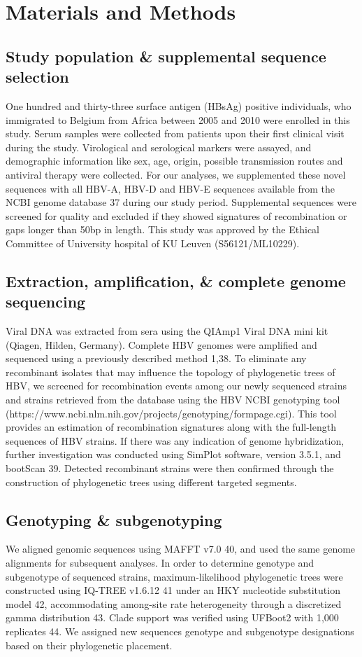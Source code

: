 \section{Materials and Methods}
\subsection{Study population \& supplemental sequence selection}
One hundred and thirty-three surface antigen (HBsAg) positive individuals, who immigrated to Belgium from Africa between 2005 and 2010 were enrolled in this study. Serum samples were collected from patients upon their first clinical visit during the study. Virological and serological markers were assayed, and demographic information like sex, age, origin, possible transmission routes and antiviral therapy were collected. For our analyses, we supplemented these novel sequences with all HBV-A, HBV-D and HBV-E sequences available from the NCBI genome database 37 during our study period. Supplemental sequences were screened for quality and excluded if they showed signatures of recombination or gaps longer than 50bp in length. This study was approved by the Ethical Committee of University hospital of KU Leuven (S56121/ML10229).\\

\subsection{Extraction, amplification, \& complete genome sequencing}

Viral DNA was extracted from sera using the QIAmp1 Viral DNA mini kit (Qiagen, Hilden, Germany). Complete HBV genomes were amplified and sequenced using a previously described method 1,38. To eliminate any recombinant isolates that may influence the topology of phylogenetic trees of HBV, we screened for recombination events among our newly sequenced strains and strains retrieved from the database using the HBV NCBI genotyping tool (https://www.ncbi.nlm.nih.gov/projects/genotyping/formpage.cgi). This tool provides an estimation of recombination signatures along with the full-length sequences of HBV strains. If there was any indication of genome hybridization, further investigation was conducted using SimPlot software, version 3.5.1, and bootScan 39. Detected recombinant strains were then confirmed through the construction of phylogenetic trees using different targeted segments.

\subsection{Genotyping \& subgenotyping}
We aligned genomic sequences using MAFFT v7.0 40, and used the same genome alignments for subsequent analyses. In order to determine genotype and subgenotype of sequenced strains, maximum-likelihood phylogenetic trees were constructed using IQ-TREE v1.6.12 41 under an HKY nucleotide substitution model 42, accommodating among-site rate heterogeneity through a discretized gamma distribution 43. Clade support was verified using UFBoot2 with 1,000 replicates 44. We assigned new sequences genotype and subgenotype designations based on their phylogenetic placement.

